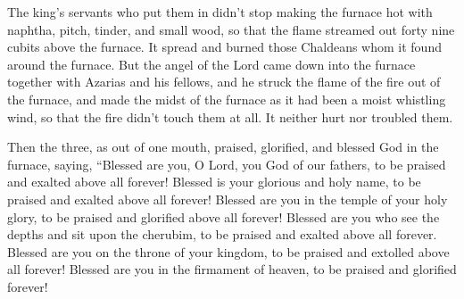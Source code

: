  The king's servants who put them in didn't stop making the
furnace hot with naphtha, pitch, tinder, and small wood, 
so that the flame streamed out forty nine cubits above the furnace.
 It spread and burned those Chaldeans whom it found around
the furnace.  But the angel of the Lord came down into the
furnace together with Azarias and his fellows, and he struck the flame
of the fire out of the furnace,  and made the midst of the
furnace as it had been a moist whistling wind, so that the fire didn't
touch them at all. It neither hurt nor troubled them.

 Then the three, as out of one mouth, praised, glorified,
and blessed God in the furnace, saying,  ``Blessed are you,
O Lord, you God of our fathers, to be praised and exalted above all
forever!  Blessed is your glorious and holy name, to be
praised and exalted above all forever!  Blessed are you in
the temple of your holy glory, to be praised and glorified above all
forever!  Blessed are you who see the depths and sit upon
the cherubim, to be praised and exalted above all forever. 
Blessed are you on the throne of your kingdom, to be praised and
extolled above all forever!  Blessed are you in the
firmament of heaven, to be praised and glorified forever!


